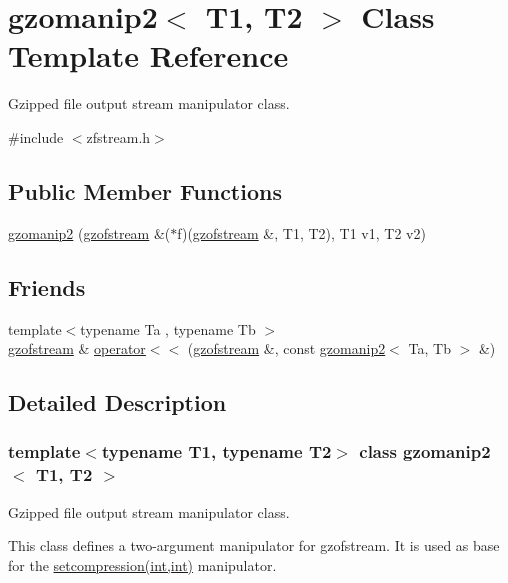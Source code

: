 \hypertarget{classgzomanip2}{}\section{gzomanip2$<$ T1, T2 $>$ Class Template Reference}
\label{classgzomanip2}


Gzipped file output stream manipulator class.  




{\ttfamily \#include $<$zfstream.\+h$>$}

\subsection*{Public Member Functions}
\begin{DoxyCompactItemize}
\item 
\hyperlink{classgzomanip2_a6e3980ce2fa39e29ecfa537bb8e9ddb0}{gzomanip2} (\hyperlink{classgzofstream}{gzofstream} \&($\ast$f)(\hyperlink{classgzofstream}{gzofstream} \&, T1, T2), T1 v1, T2 v2)
\end{DoxyCompactItemize}
\subsection*{Friends}
\begin{DoxyCompactItemize}
\item 
{\footnotesize template$<$typename Ta , typename Tb $>$ }\\\hyperlink{classgzofstream}{gzofstream} \& \hyperlink{classgzomanip2_a2382d2b86b2af773d17c2bc349fddb4f}{operator$<$$<$} (\hyperlink{classgzofstream}{gzofstream} \&, const \hyperlink{classgzomanip2}{gzomanip2}$<$ Ta, Tb $>$ \&)
\end{DoxyCompactItemize}


\subsection{Detailed Description}
\subsubsection*{template$<$typename T1, typename T2$>$\newline
class gzomanip2$<$ T1, T2 $>$}

Gzipped file output stream manipulator class. 

This class defines a two-\/argument manipulator for gzofstream. It is used as base for the \hyperlink{zfstream_8h_a9faf10ab9ba2398c393ad3691421c180}{setcompression(int,int)} manipulator. 

